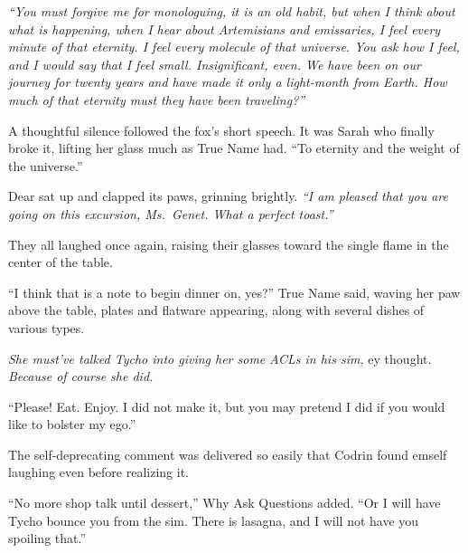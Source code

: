 \emph{``You must forgive me for monologuing, it is an old habit, but when I think about what is happening, when I hear about Artemisians and emissaries, I feel every minute of that eternity. I feel every molecule of that universe. You ask how I feel, and I would say that I feel small. Insignificant, even. We have been on our journey for twenty years and have made it only a light-month from Earth. How much of that eternity must they have been traveling?''}

A thoughtful silence followed the fox's short speech. It was Sarah who finally broke it, lifting her glass much as True Name had. ``To eternity and the weight of the universe.''

Dear sat up and clapped its paws, grinning brightly. \emph{``I am pleased that you are going on this excursion, Ms.~Genet. What a perfect toast.''}

They all laughed once again, raising their glasses toward the single flame in the center of the table.

``I think that is a note to begin dinner on, yes?'' True Name said, waving her paw above the table, plates and flatware appearing, along with several dishes of various types.

\emph{She must've talked Tycho into giving her some ACLs in his sim,} ey thought. \emph{Because of course she did.}

``Please! Eat. Enjoy. I did not make it, but you may pretend I did if you would like to bolster my ego.''

The self-deprecating comment was delivered so easily that Codrin found emself laughing even before realizing it.

``No more shop talk until dessert,'' Why Ask Questions added. ``Or I will have Tycho bounce you from the sim. There is lasagna, and I will not have you spoiling that.''
